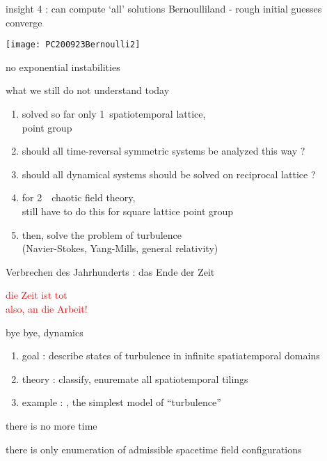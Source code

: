 \begin{frame}{insight 4 : can compute `all' solutions}
Bernoulliland - rough initial guesses converge
\begin{center}
\hfill\texttt{[image: PC200923Bernoulli2]}
\end{center}
no exponential instabilities
\end{frame} %

\begin{frame} {what we still do not understand today}
  \begin{enumerate}
              \item
solved so far only 1\dmn\ {\color{orange}spatio}{temporal} lattice,
\\
point group 
              \item
should all time-reversal symmetric systems be analyzed this way ?
              \item
should all dynamical systems should be solved on reciprocal lattice ?
              \item
for 2\dmn\ \spt\ chaotic field theory,
\\
still have to do this for square lattice point group 
              \item
then, solve the problem of turbulence \\
(Navier-Stokes, Yang-Mills, general relativity)
   \end{enumerate}
\end{frame} %

\begin{frame}{Verbrechen des Jahrhunderts : das Ende der Zeit}
\begin{center}
\textcolor{red}{{\huge die Zeit ist tot}
    \\
{also, an die Arbeit!}}
\end{center}
\end{frame} %

\begin{frame}{bye bye, dynamics}
\begin{enumerate}
              \item
goal : describe states of turbulence in infinite spatiatemporal domains
              \item
theory : classify, enuremate all spatiotemporal tilings
              \item
example : \catlatt, the simplest model of ``turbulence''
\end{enumerate}

\vfill

there is no more time

\medskip

there is only enumeration of admissible spacetime field configurations
\end{frame} %

